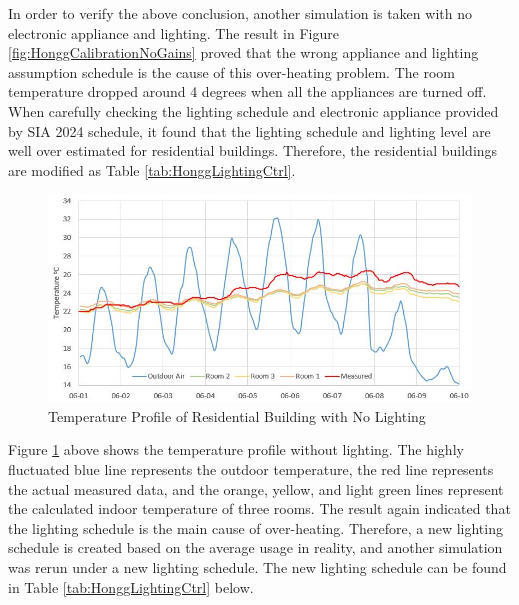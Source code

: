 \documentclass[a4paper, oneside]{discothesis}
\begin{document}
			In order to verify the above conclusion, another simulation is taken with no electronic appliance and lighting. The result in Figure \ref{fig:HonggCalibrationNoGains} proved that the wrong appliance and lighting assumption schedule is the cause of this over-heating problem. The room temperature dropped around 4 degrees when all the appliances are turned off. When carefully checking the lighting schedule and electronic appliance provided by SIA 2024 schedule, it found that the lighting schedule and lighting level are well over estimated for residential buildings. Therefore, the residential buildings are modified as Table \ref{tab:HonggLightingCtrl}. \\

			\begin{figure}[H]
			\centering
			\includegraphics[scale=0.75]{Hongg_Clibration_03NoLight.JPG}
			\caption{Temperature Profile of Residential Building with No Lighting}
			\label{fig:HonggerCalibrationNoLight}
			\end{figure}

			Figure \ref{fig:HonggerCalibrationNoLight} above shows the temperature profile without lighting. The highly fluctuated blue line represents the outdoor temperature, the red line represents the actual measured data, and the orange, yellow, and light green lines represent  the calculated indoor temperature of three rooms. The result again indicated that the lighting schedule is the main cause of over-heating. Therefore, a new lighting schedule is created based on the average usage in reality, and another simulation was rerun under a new lighting schedule. The new lighting schedule can be found in Table \ref{tab:HonggLightingCtrl} below.
			
\end{document}
